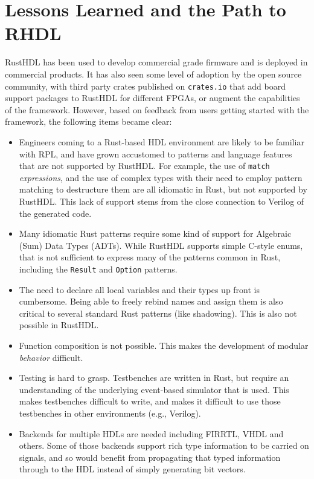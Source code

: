 \documentclass[conference]{IEEEtran}
\begin{document}
\section{Lessons Learned and the Path to RHDL}\label{sec:future}

RustHDL has been used to develop commercial grade firmware and is deployed in commercial products.  It has also seen 
some level of adoption by the open source community, with third party crates published on \verb|crates.io| that add board
support packages to RustHDL for different FPGAs, or augment the capabilities of the framework.  However, based on
feedback from users getting started with the framework, the following items became clear:

\begin{itemize}
  \item Engineers coming to a Rust-based HDL environment are likely to be familiar with RPL,
  and have grown accustomed to patterns and language features that are not supported by RustHDL.  For example, the 
  use of \verb|match| \emph{expressions}, and the use of complex types with their need to employ pattern matching to destructure 
  them are all idiomatic in Rust, but not supported by RustHDL.  This lack of support stems from the close 
  connection to Verilog of the generated code.
  \item Many idiomatic Rust patterns require some kind of support for Algebraic (Sum) Data Types (ADTs).  While RustHDL
  supports simple C-style enums, that is not sufficient to express many of the patterns common in Rust, including the 
  \verb|Result| and \verb|Option| patterns.
  \item The need to declare all local variables and their types up front is cumbersome.  Being able to freely rebind
  names and assign them is also critical to several standard Rust patterns (like shadowing).  This is also not
  possible in RustHDL.
  \item Function composition is not possible.  This makes the development of modular \emph{behavior} difficult.
  \item Testing is hard to grasp.  Testbenches are written in Rust, but require an understanding of the underlying
  event-based simulator that is used.  This makes testbenches difficult to write, and makes it difficult to use those
  testbenches in other environments (e.g., Verilog).
  \item Backends for multiple HDLs are needed including FIRRTL, VHDL and others.  Some of those backends support
  rich type information to be carried on signals, and so would benefit from propagating that typed information through
  to the HDL instead of simply generating bit vectors.
\end{itemize}
\end{document}
